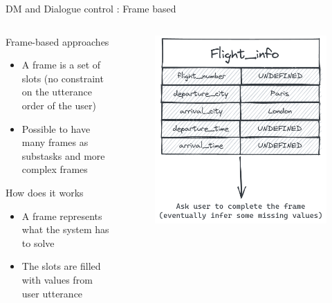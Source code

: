 \documentclass[10pt,aspectratio=169]{beamer}
\begin{document}
\begin{frame}{DM and Dialogue control : Frame based}
    \begin{columns}
        \begin{column}{0.5\textwidth}
            \begin{block}{Frame-based approaches}
                \begin{itemize}
                    \item A frame is a set of slots (no constraint on the utterance order of the user)
                    \item Possible to have many frames as substasks and more complex frames

                \end{itemize}
            \end{block}
            \begin{block}{How does it works}
                \begin{itemize}
                    \item A frame represents what the system has to solve
                    \item The slots  are filled  with values from user utterance
                \end{itemize}
            \end{block}
        \end{column}
        \begin{column}{0.5\textwidth}
            \begin{figure}
                \centering
                \includegraphics[width=.8\textwidth]{media/frame.png}
            \end{figure}
        \end{column}
    \end{columns}
\end{frame}
\end{document}
